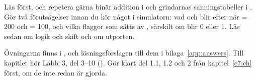 Läs  först, och repetera gärna binär addition i  och grindarnas
sanningstabeller i . Gör två förutsägelser innan du kör något i simulatorn: vad
 och  blir efter  när  = 200 och  = 100, och vilka
flaggor som sätts av , särskilt om  blir 0 eller 1. Läs sedan
 om logik och skift och  om utporten.

Övningarna finns i , och lösningsförslagen till dem i
bilaga~\ref{app:answers}. Till kapitlet hör Labb~3, del 3--10 (). Gör klart
del 1.1, 1.2 och 2 från kapitel~\ref{c7:ch} först, om de inte redan är gjorda.






